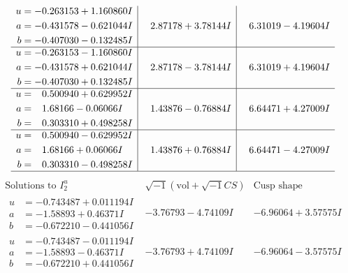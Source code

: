 \documentclass[1p]{elsarticle_modified}
\theoremstyle{definition}
\newcommand{\I}{\sqrt{-1}}
\begin{document}
$$\begin{array}{c|c|c}
\begin{aligned}
u &= -0.263153 + 1.160860 I \\
a &= -0.431578 - 0.621044 I \\
b &= -0.407030 - 0.132485 I\end{aligned}
 & \phantom{-}2.87178 + 3.78144 I & \phantom{-}6.31019 - 4.19604 I \\ \hline\begin{aligned}
u &= -0.263153 - 1.160860 I \\
a &= -0.431578 + 0.621044 I \\
b &= -0.407030 + 0.132485 I\end{aligned}
 & \phantom{-}2.87178 - 3.78144 I & \phantom{-}6.31019 + 4.19604 I \\ \hline\begin{aligned}
u &= \phantom{-}0.500940 + 0.629952 I \\
a &= \phantom{-}1.68166 - 0.06066 I \\
b &= \phantom{-}0.303310 + 0.498258 I\end{aligned}
 & \phantom{-}1.43876 - 0.76884 I & \phantom{-}6.64471 + 4.27009 I \\ \hline\begin{aligned}
u &= \phantom{-}0.500940 - 0.629952 I \\
a &= \phantom{-}1.68166 + 0.06066 I \\
b &= \phantom{-}0.303310 - 0.498258 I\end{aligned}
 & \phantom{-}1.43876 + 0.76884 I & \phantom{-}6.64471 - 4.27009 I\\
 \hline 
 \end{array}$$\newpage$$\begin{array}{c|c|c}  
\text{Solutions to }I^u_{2}& \I (\text{vol} + \sqrt{-1}CS) & \text{Cusp shape}\\
 \hline 
\begin{aligned}
u &= -0.743487 + 0.011194 I \\
a &= -1.58893 + 0.46371 I \\
b &= -0.672210 - 0.441056 I\end{aligned}
 & -3.76793 - 4.74109 I & -6.96064 + 3.57575 I \\ \hline\begin{aligned}
u &= -0.743487 - 0.011194 I \\
a &= -1.58893 - 0.46371 I \\
b &= -0.672210 + 0.441056 I\end{aligned}
 & -3.76793 + 4.74109 I & -6.96064 - 3.57575 I \\ \hline\begin{aligned}

\end{aligned}
\end{array}$$
\end{document}
